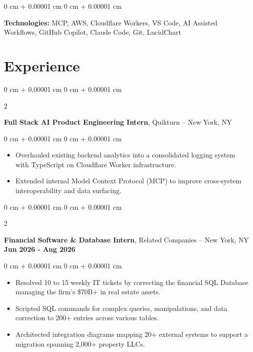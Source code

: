 \documentclass[10pt, letterpaper]{article}
\newenvironment{highlights}{
    \begin{itemize}[
        topsep=0.10 cm,
        parsep=0.10 cm,
        partopsep=0pt,
        itemsep=0pt,
        leftmargin=0 cm + 10pt
    ]
}{
    \end{itemize}
} %
\newenvironment{onecolentry}{
    \begin{adjustwidth}{
        0 cm + 0.00001 cm
    }{
        0 cm + 0.00001 cm
    }
}{
    \end{adjustwidth}
} %
\newenvironment{twocolentry}[2][]{
    \onecolentry%
    \def\secondColumn{#2}
    \setcolumnwidth{\fill, 7.0 cm}
    \begin{paracol}{2}
}{
    \switchcolumn\raggedleft\secondColumn%
    \end{paracol}
    \endonecolentry%
} %
\begin{document}
        \vspace{0.10 cm}
        
        \begin{onecolentry}
            \textbf{Technologies:} MCP, AWS, Cloudflare Workers, VS Code, AI Assisted Workflows, GitHub Copilot, Claude Code, Git, LucidChart
        \end{onecolentry}
    
    {\color{secondaryColor}\section{Experience}}

        \begin{twocolentry}
            {{\color{secondaryColor}\textbf{Aug 2026 - Jan 2027}}}
            \textbf{Full Stack AI Product Engineering Intern}, Quikturn -- New York, NY\end{twocolentry}

        \vspace{0.10 cm}
        \begin{onecolentry}
            \begin{highlights}
                \item Overhauled existing backend analytics into a consolidated logging system with TypeScript on Cloudflare Worker infrastructure.
                \item Extended internal Model Context Protocol (MCP) to improve cross-system interoperability and data surfacing.
            \end{highlights}
        \end{onecolentry}

        \vspace{0.10 cm}
        
        \begin{twocolentry}{
            {\color{secondaryColor}\textbf{Jun 2026 - Aug 2026}}
        }
            \textbf{Financial Software \& Database Intern}, Related Companies -- New York, NY\end{twocolentry}

        \vspace{0.10 cm}
        \begin{onecolentry}
            \begin{highlights}
                \item Resolved 10 to 15 weekly IT tickets by correcting the financial SQL Database managing the firm's \$70B+ in real estate assets.
                \item Scripted SQL commands for complex queries, manipulations, and data correction to 200+ entries across various tables.
                \item Architected integration diagrams mapping 20+ external systems to support a migration spanning 2,000+ property LLCs.
            \end{highlights}
        \end{onecolentry}
\end{document}
